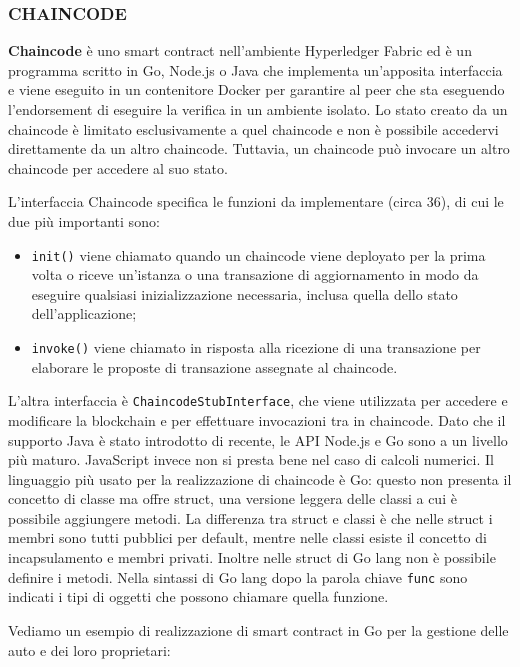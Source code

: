 \subsubsection{\textbf{CHAINCODE}}

\textbf{Chaincode} è uno smart contract nell'ambiente Hyperledger Fabric ed è un programma scritto in Go, Node.js o Java che implementa un'apposita interfaccia e viene eseguito in un contenitore Docker per garantire al peer che sta eseguendo l'endorsement di eseguire la verifica in un ambiente isolato. Lo stato creato da un chaincode è limitato esclusivamente a quel chaincode e non è possibile accedervi direttamente da un altro chaincode. Tuttavia, un chaincode può invocare un altro chaincode per accedere al suo stato.

L'interfaccia Chaincode specifica le funzioni da implementare (circa 36), di cui le due più importanti sono:
\begin{itemize}
    \item \texttt{init()} viene chiamato quando un chaincode viene deployato per la prima volta o riceve un'istanza o una transazione di aggiornamento in modo da eseguire qualsiasi inizializzazione necessaria, inclusa quella dello stato dell'applicazione;
    \item \texttt{invoke()} viene chiamato in risposta alla ricezione di una transazione per elaborare le proposte di transazione assegnate al chaincode.
\end{itemize}
L'altra interfaccia è \texttt{ChaincodeStubInterface}, che viene utilizzata per accedere e modificare la blockchain e per effettuare invocazioni tra in chaincode. Dato che il supporto Java è stato introdotto di recente, le API Node.js e Go sono a un livello più maturo. JavaScript invece non si presta bene nel caso di calcoli numerici. Il linguaggio più usato per la realizzazione di chaincode è Go: questo non presenta il concetto di classe ma offre struct, una versione leggera delle classi a cui è possibile aggiungere metodi. La differenza tra struct e classi è che nelle struct i membri sono tutti pubblici per default, mentre nelle classi esiste il concetto di incapsulamento e membri privati. Inoltre nelle struct di Go lang non è possibile definire i metodi. Nella sintassi di Go lang dopo la parola chiave \texttt{func} sono indicati i tipi di oggetti che possono chiamare quella funzione.

Vediamo un esempio di realizzazione di smart contract in Go per la gestione delle auto e dei loro proprietari:


